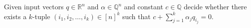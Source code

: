 \begin{problem}[\(k\)-LDT]
 Given input vectors \(q\in\mathbb{R}^n\) and
 $\alpha \in \mathbb{Q}^n$ and constant $c \in \mathbb{Q}$
 decide whether there exists a
 $k$-tuple \((i_1, i_2,\ldots ,i_k) \in {[n]}^k\) such that
 \(c + \sum_{j=1}^k \alpha_j q_{i_j} = 0\).
 \end{problem}
